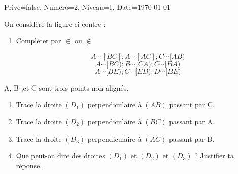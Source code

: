 \documentclass[a4paper,12pt]{article}
\begin{document}
\begin{Maquette}[DM]{Prive=false, Numero=2, Niveau=1, Date=\today}


\begin{exercice}
\begin{minipage}{.5\linewidth}
On considère la figure ci-contre :
\begin{enumerate}
\item Compléter par $\in$ ou $\notin$

$$A\cdots [BC] ; A\cdots [AC] ; C\cdots [AB)$$
$$A\cdots [BC) ; B\cdots [CA) ; C\cdots [BA)$$
$$A\cdots [BE) ; C\cdots [ED) ; D\cdots [BE)$$

\end{enumerate}
\end{minipage}
\begin{minipage}{.5\linewidth}
\end{minipage}
\end{exercice}

\begin{exercice}
\begin{minipage}{.6\linewidth}
A, B ,et C sont trois points non alignés. 
\begin{enumerate}
\item Trace la droite $(D_{1})$ perpendiculaire à $(AB)$ passant par C.
\item Trace la droite $(D_{2})$ perpendiculaire à $(BC)$ passant par A.
\item Trace la droite $(D_{3})$ perpendiculaire à $(AC)$ passant par B.
\item Que peut-on dire des droites $(D_{1})$ et $(D_{2})$ et $(D_{3})$ ? Justifier ta réponse.

\end{enumerate}
\end{minipage}
\begin{minipage}{.4\linewidth}
\end{minipage}

\end{exercice}


\end{Maquette}
\end{document}

